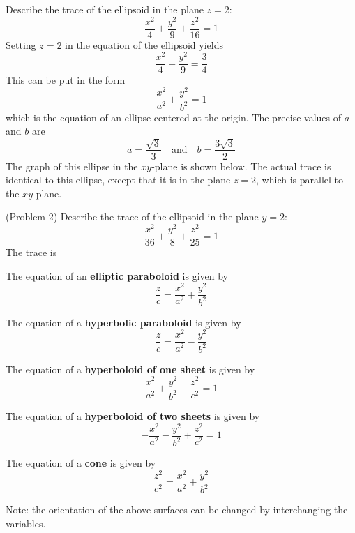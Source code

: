 \documentclass[handout]{ximera}
\begin{document}
\begin{example}[Example 2]
Describe the trace of the ellipsoid in the plane $z = 2$:
\[
\frac{x^2}{4} + \frac{y^2}{9}+ \frac{z^2}{16} = 1
\]
Setting $z = 2$ in the equation of the ellipsoid yields
\[
\frac{x^2}{4} + \frac{y^2}{9} = \frac34
\]
This can be put in the form
\[
\frac{x^2}{a^2} + \frac{y^2}{b^2} = 1
\]
which is the equation of an ellipse centered at the origin. The precise values of $a$ and $b$ are
\[
a = \frac{\sqrt 3}{3} \quad \text{and} \quad b = \frac{3\sqrt 3}{2}
\]
The graph of this ellipse in the $xy$-plane is shown below.
The actual trace is identical to this ellipse, except that it is in the plane $z = 2$, which is parallel to the $xy$-plane.

\begin{image}
\end{image}

\end{example}

\begin{problem}(Problem 2)
Describe the trace of the ellipsoid in the plane $y = 2$:
\[
\frac{x^2}{36} + \frac{y^2}{8}+ \frac{z^2}{25} = 1
\]
The trace is 
\end{problem}

The equation of an \textbf{elliptic paraboloid} is given by 
\[
\frac{z}{c} = \frac{x^2}{a^2} + \frac{y^2}{b^2} 
\]

The equation of a \textbf{hyperbolic paraboloid} is given by 
\[
\frac{z}{c} = \frac{x^2}{a^2} - \frac{y^2}{b^2} 
\]

The equation of a \textbf{hyperboloid of one sheet} is given by 
\[
\frac{x^2}{a^2} + \frac{y^2}{b^2}- \frac{z^2}{c^2} = 1
\]

The equation of a \textbf{hyperboloid of two sheets} is given by 
\[
-\frac{x^2}{a^2} -\frac{y^2}{b^2} + \frac{z^2}{c^2} = 1
\]

The equation of a \textbf{cone} is given by 
\[
\frac{z^2}{c^2} = \frac{x^2}{a^2} + \frac{y^2}{b^2}
\]

Note: the orientation of the above surfaces can be changed by interchanging the variables.
\end{document}
